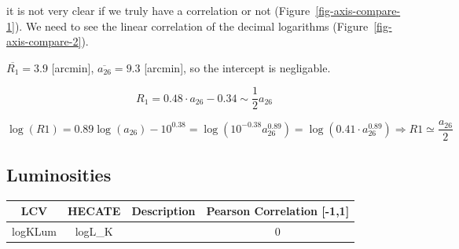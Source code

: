 \documentclass[
]{article}
\begin{document}
it is not very clear if we truly have a correlation or not
(Figure~\ref{fig-axis-compare-1}). We need to see the linear correlation
of the decimal logarithms (Figure~\ref{fig-axis-compare-2}).

\(\overline{R_1} = 3.9\) {[}arcmin{]}, \(\overline{a_{26}} = 9.3\)
{[}arcmin{]}, so the intercept is negligable.

\[
R_1 = 0.48\cdot a_{26}-0.34 \sim \frac{1}{2}a_{26}
\]

\[
\log(R1) = 0.89\log(a_{26})-10^{0.38} = \log(10^{-0.38}a_{26}^{0.89}) = \log(0.41\cdot a_{26}^{0.89})\Rightarrow R1\simeq \frac{a_{26}}{2}
\]

\subsection{Luminosities}\label{luminosities}

\begin{longtable}[]{@{}cccc@{}}
\toprule\noalign{}
LCV & HECATE & Description & Pearson Correlation {[}-1,1{]} \\
\midrule\noalign{}
\endhead
\bottomrule\noalign{}
\endlastfoot
logKLum & logL\_K & & 0 \\
\end{longtable}
\end{document}
